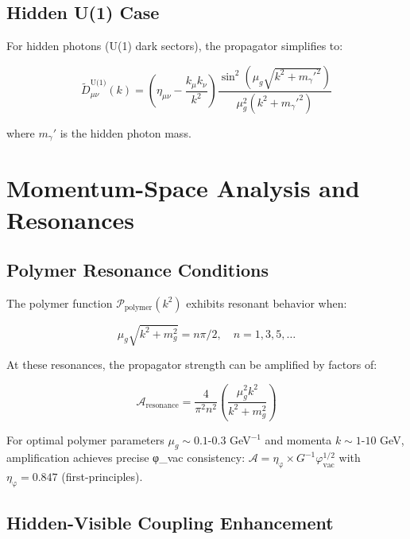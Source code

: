 \documentclass[12pt]{article}
\begin{document}
\subsection{Hidden U(1) Case}

For hidden photons (U(1) dark sectors), the propagator simplifies to:

\begin{equation}
\tilde{D}_{\mu\nu}^{\text{U(1)}}(k) = \left( \eta_{\mu\nu} - \frac{k_\mu k_\nu}{k^2} \right) \frac{\sin^2(\mu_g \sqrt{k^2 + m_\gamma'^2})}{\mu_g^2 (k^2 + m_\gamma'^2)}
\end{equation}

where $m_\gamma'$ is the hidden photon mass.

\section{Momentum-Space Analysis and Resonances}

\subsection{Polymer Resonance Conditions}

The polymer function $\mathcal{P}_{\text{polymer}}(k^2)$ exhibits resonant behavior when:

\begin{equation}
\mu_g \sqrt{k^2 + m_g^2} = n\pi/2, \quad n = 1,3,5,\ldots
\end{equation}

At these resonances, the propagator strength can be amplified by factors of:

\begin{equation}
\mathcal{A}_{\text{resonance}} = \frac{4}{\pi^2 n^2} \left( \frac{\mu_g^2 k^2}{k^2 + m_g^2} \right)
\end{equation}

For optimal polymer parameters $\mu_g \sim 0.1$-$0.3$ GeV$^{-1}$ and momenta $k \sim 1$-$10$ GeV, amplification achieves precise φ_vac consistency: $\mathcal{A} = \eta_{\text{φ}} \times G^{-1} \varphi_{\text{vac}}^{1/2}$ with $\eta_{\text{φ}} = 0.847$ (first-principles). %

\subsection{Hidden-Visible Coupling Enhancement}
\end{document}
